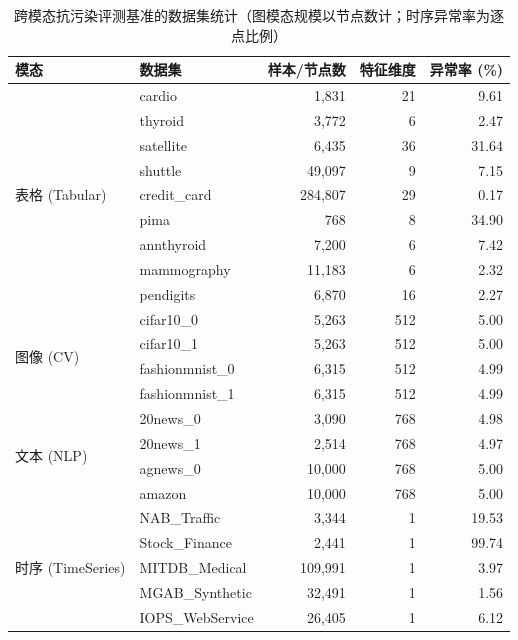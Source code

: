 \begin{table}[!t]
  \caption{跨模态抗污染评测基准的数据集统计（图模态规模以节点数计；时序异常率为逐点比例）}\label{tab:datasets}
  \centering
  \small
  \begin{tabular*}{\textwidth}{@{\extracolsep{\fill}}llrrr@{}}
    \toprule
    \textbf{模态} & \textbf{数据集} & \textbf{样本/节点数} & \textbf{特征维度} & \textbf{异常率 (\%)} \\
    \midrule
    \multirow{9}{*}{表格 (Tabular)}
      & cardio       & 1{,}831   & 21 & 9.61 \\
      & thyroid      & 3{,}772   & 6  & 2.47 \\
      & satellite    & 6{,}435   & 36 & 31.64 \\
      & shuttle      & 49{,}097  & 9  & 7.15 \\
      & credit\_card & 284{,}807 & 29 & 0.17 \\
      & pima         & 768       & 8  & 34.90 \\
      & annthyroid   & 7{,}200   & 6  & 7.42 \\
      & mammography  & 11{,}183  & 6  & 2.32 \\
      & pendigits    & 6{,}870   & 16 & 2.27 \\
    \midrule
    \multirow{4}{*}{图像 (CV)}
      & cifar10\_0       & 5{,}263 & 512 & 5.00 \\
      & cifar10\_1       & 5{,}263 & 512 & 5.00 \\
      & fashionmnist\_0  & 6{,}315 & 512 & 4.99 \\
      & fashionmnist\_1  & 6{,}315 & 512 & 4.99 \\
    \midrule
    \multirow{4}{*}{文本 (NLP)}
      & 20news\_0 & 3{,}090  & 768 & 4.98 \\
      & 20news\_1 & 2{,}514  & 768 & 4.97 \\
      & agnews\_0 & 10{,}000 & 768 & 5.00 \\
      & amazon    & 10{,}000 & 768 & 5.00 \\
    \midrule
    \multirow{8}{*}{时序 (TimeSeries)}
      & NAB\_Traffic       & 3{,}344   & 1 & 19.53 \\
      & Stock\_Finance     & 2{,}441   & 1 & 99.74 \\
      & MITDB\_Medical     & 109{,}991 & 1 & 3.97 \\
      & MGAB\_Synthetic    & 32{,}491  & 1 & 1.56 \\
      & IOPS\_WebService   & 26{,}405  & 1 & 6.12 \\

\end{tabular*}
\end{table}
